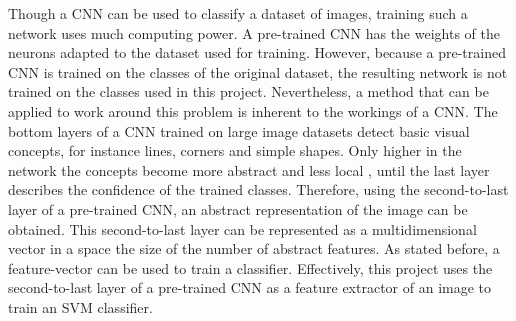 Though a CNN can be used to classify a dataset of images, training such a network uses much computing power.
A pre-trained CNN has the weights of the neurons adapted to the dataset used for training.
However, because a pre-trained CNN is trained on the classes of the original dataset, the resulting network is not trained on the classes used in this project.
Nevertheless, a method that can be applied to work around this problem is inherent to the workings of a CNN.
The bottom layers of a CNN trained on large image datasets detect basic visual concepts, for instance lines, corners and simple shapes.
Only higher in the network the concepts become more abstract and less local \citep{zeiler2014visualizing}, until the last layer describes the confidence of the trained classes.
Therefore, using the second-to-last layer of a pre-trained CNN, an abstract representation of the image can be obtained.
This second-to-last layer can be represented as a multidimensional vector in a space the size of the number of abstract features.
As stated before, a feature-vector can be used to train a classifier.
Effectively, this project uses the second-to-last layer of a pre-trained CNN as a feature extractor of an image to train an SVM classifier.

